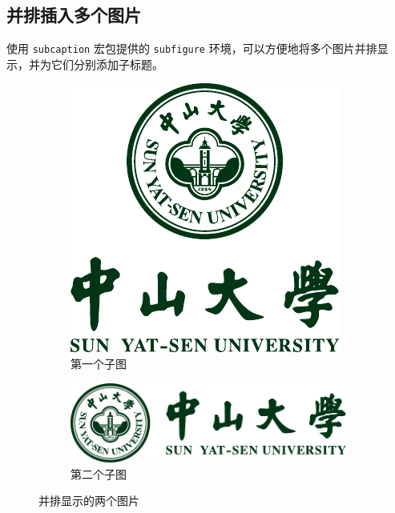 \documentclass[../main]{subfiles}
\begin{document}
\subsection{并排插入多个图片}
使用 \texttt{subcaption} 宏包提供的 \texttt{subfigure} 环境，可以方便地将多个图片并排显示，并为它们分别添加子标题。

\begin{figure}[H]
    \centering
    \begin{subfigure}{0.45\textwidth}
        \centering
        \includegraphics[width=\linewidth]{figure/badge.pdf}
        \caption{第一个子图}
        \label{fig:subfig-a}
    \end{subfigure}
    \hfill %
    \begin{subfigure}{0.45\textwidth}
        \centering
        \includegraphics[width=\linewidth]{figure/badge-horizonal.pdf}
        \caption{第二个子图}
        \label{fig:subfig-b}
    \end{subfigure}
    \caption{并排显示的两个图片}
    \label{fig:side-by-side}
\end{figure}
\end{document}
